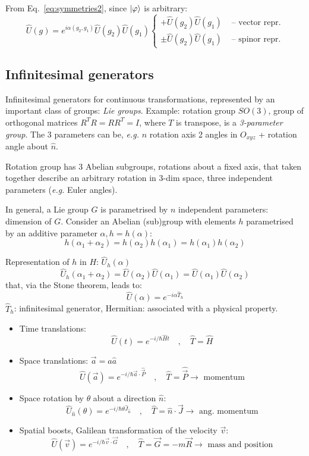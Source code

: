 \documentclass[12pt]{article}
\newcommand{\be}{\begin{equation}}
\newcommand{\ee}{\end{equation}}
\begin{document}
From Eq.~\eqref{eq:symmetries2}, since $\ket{\varphi}$ is arbitrary:
\[
\hat{U}(g)=e^{i \alpha(g_{2}, g_{1})} \hat{U}(g_{2}) \hat{U}(g_{1})
\left\{
\begin{aligned}
+\hat{U}(g_{2}) \hat{U}(g_{1}) 
&\text{ -- vector repr.}\\
\pm\hat{U}(g_{2}) \hat{U}(g_{1}) 
&\text{ -- spinor repr.}
\end{aligned}
\right.
\]

\subsection{Infinitesimal generators}

Infinitesimal generators 
for continuous transformations, represented
by an important class of groups: \emph{Lie groups}.
Example: rotation group \(S O(3)\), group of orthogonal
matrices \(R^{T} R=RR^{T} =I\), where  \(T\) is transpose,
is a \emph{3-parameter group}.
The 3 parameters can be, \textit{e.g.}
\(n\) rotation axis
2 angles in \(O_{xyz}\) + 
rotation angle about \(\hat{n}\).

Rotation group has 3 Abelian subgroups,
rotations about a fixed axis, that taken together
describe an arbitrary rotation in 3-dim space,
three independent parameters (\emph{e.g.} Euler angles).

In general, a Lie group \(G\) is parametrised by
\(n\) independent parameters: dimension of \(G\).
Consider an Abelian (sub)group with elements \(h\)
parametrised by an additive parameter \(\alpha, h=h(\alpha)\):
\be
h\left(\alpha_{1}+\alpha_{2}\right)=h\left(\alpha_{2}\right) h\left(\alpha_{1}\right)=h\left(\alpha_{1}\right) h\left(\alpha_{2}\right)
\ee


Representation of $h$ in $H$: $\hat{U}_h(\alpha)$
\be
\hat{U}_h(\alpha_1+\alpha_2) = \hat{U}(\alpha_2)\hat{U}(\alpha_1) = \hat{U}(\alpha_1)\hat{U}(\alpha_2)
\ee
that, via the Stone theorem, leads to:
\be
\hat{U}(\alpha) = e^{-i\alpha \hat{T}_h}
\ee
$\hat{T}_h$: infinitesimal generator, Hermitian: associated with a physical property.

\begin{itemize}
\item Time translations:
\be
\hat{U}(t)=e^{-i / \hbar \hat{H} t} \quad,\quad \hat{T}=\hat{H}
\ee
%
\item Space translations: $\vec{a}=a \hat{a}$
\be
\hat{U}(\vec{a})=e^{-i / \hbar \vec{a} \cdot \hat{\vec{P}}} \quad,\quad \hat{T}=\hat{\vec{P}} \rightarrow \text{ momentum}
\ee
%
\item Space rotation by $\theta$ about a direction $\hat{n}$:
\be
\hat{U}_{\hat{n}}(\theta)=e^{-i / \hbar \theta \hat{J}_{\hat{n}}} \quad,\quad \hat{T}=\hat{n} \cdot \vec{J} \rightarrow \text{ ang. momentum}
\ee
%
\item Spatial boosts, Galilean transformation of the velocity $\vec{v}$:
\be
\hat{U}(\vec{v})=e^{-i / \hbar \vec{v} \cdot \vec{G}} \quad,\quad \hat{T}=\vec{G}=-m \vec{R} \rightarrow \text{ mass and position}
\ee
\end{itemize}
\end{document}
